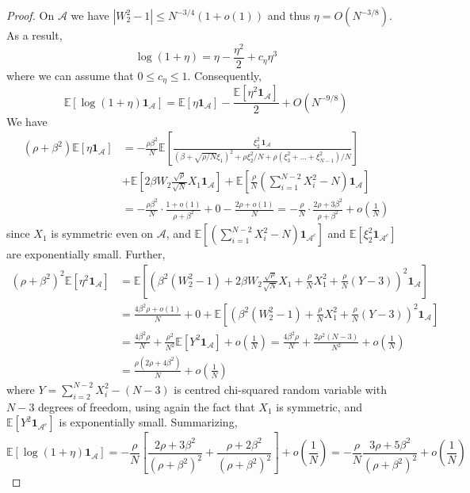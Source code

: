 \documentclass[12pt]{article}
\newcommand{\E}{\mathbb{E}}
\newcommand{\1}{\mathbf{1}}
\begin{document}
\begin{proof}
On $\mathcal{A}$ we have $|W_2^2-1|\le N^{-3/4}(1+o(1))$ and thus $\eta=O(N^{-3/8})$. As a result,
$$
\log(1+\eta)=\eta-\frac{\eta^2}{2}+c_{\eta}\eta^3
$$
where we can assume that $0\le c_\eta\le 1$.
Consequently,
$$
\E\left[\log(1+\eta) \1_{\mathcal{A}}\right]=\E[\eta\1_{\mathcal{A}}]
-\frac{\E[\eta^2\1_{\mathcal{A}}]}{2}+O(N^{-9/8})
$$
We have
\begin{align*}
(\rho+\beta^2)\E[\eta\1_{\mathcal{A}}]
&=
-\frac{\rho\beta^2}{N} 
\E\left[ 
\frac{\xi_2^2 \, \1_{\mathcal{A}}}{(\beta+\sqrt{\rho/N}\xi_1)^2+\rho \xi_2^2/N+\rho(\xi_3^2+\dots+\xi_{N-1}^2)/N  }\right]
\\ & +
\E\left[ 2\beta W_2\frac{\sqrt{\rho}}{\sqrt N} X_1
\1_{\mathcal{A}}\right]
+ \E\left[ \frac{\rho}{N}\left(\sum_{i=1}^{N-2} X_i^2 -N\right)
\1_{\mathcal{A}}\right]
\\ & =-\frac{\rho\beta^2}{N} \cdot \frac{1+o(1)}{\rho+\beta^2}
+0-\frac{2\rho+o(1)}{N}=-\frac{\rho}{N}\cdot\frac{2\rho+3\beta^2}{\rho+\beta^2}+o\left(\frac1N\right)
\end{align*}
since $X_1$ is symmetric even on $\mathcal{A}$, and 
$\E\left[ \left(\sum_{i=1}^{N-2} X_i^2 -N\right) \1_{\mathcal{A}^c}\right]$ and $ \E\left[ \xi_2^2\1_{\mathcal{A}^c}\right]$ are exponentially small.
Further,
\begin{align*}
(\rho+\beta^2)^2\E[\eta^2\1_{\mathcal{A}}]
&=
\E\left[
\left(
\beta^2(W_2^2-1) + 
2\beta W_2\frac{\sqrt{\rho}}{\sqrt N} X_1
+ \frac{\rho}{N}X_1^2+\frac{\rho}{N}(Y-3)
\right)^2
\1_{\mathcal{A}}\right]
\\
&=
\frac{4\beta^2\rho+o(1)}{N}
+0+\E\left[
\left(
\beta^2(W_2^2-1) + \frac{\rho}{N}X_1^2+\frac{\rho}{N}(Y-3)\right)^2\1_{\mathcal{A}}\right]
\\ &=
\frac{4\beta^2\rho}{N}
+\frac{\rho^2}{N^2}\E\left[Y^2\1_{\mathcal{A}}\right]
+o\left(\frac1N\right) 
=
\frac{4\beta^2\rho}{N}
+\frac{2\rho^2(N-3)}{N^2}
+o\left(\frac1N\right) 
\\ 
&=
\frac{\rho(2\rho+4\beta^2)}{N}
+o\left(\frac1N\right) 
\end{align*}
where $Y=\sum_{i=2}^{N-2} X_i^2 -(N-3)$ is centred chi-squared random variable with $N-3$ degrees of freedom,  using again the fact that $X_1$ is symmetric, and 
$\E\left[Y^2\1_{\mathcal{A}^c}\right]$  is exponentially small. Summarizing,
$$
\E\left[\log(1+\eta) \1_{\mathcal{A}}\right]=
-\frac{\rho}{N}\left[\frac{2\rho+3\beta^2}{(\rho+\beta^2)^2}+
\frac{\rho+2\beta^2}{(\rho+\beta^2)^2}
\right]+o\left(\frac1N\right) 
=
-\frac{\rho}{N}\frac{3\rho+5\beta^2}{(\rho+\beta^2)^2}+o\left(\frac1N\right) 
$$

\end{proof}
\end{document}
